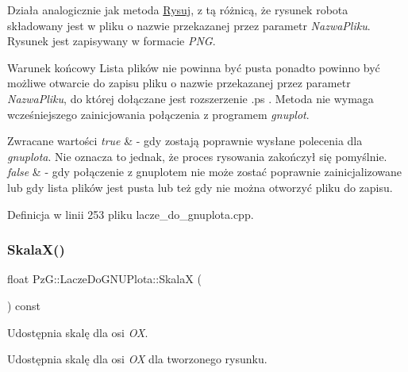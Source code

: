 Działa analogicznie jak metoda \hyperlink{class_pz_g_1_1_lacze_do_g_n_u_plota_a065f5b8402737cc62b0ad4f66d028335}{Rysuj}, z tą różnicą, że rysunek robota składowany jest w pliku o nazwie przekazanej przez parametr {\itshape Nazwa\+Pliku}. Rysunek jest zapisywany w formacie {\itshape P\+NG}.

\begin{DoxyPostcond}{Warunek końcowy}
Lista plików nie powinna być pusta ponadto powinno być możliwe otwarcie do zapisu pliku o nazwie przekazanej przez parametr {\itshape Nazwa\+Pliku}, do której dołączane jest rozszerzenie .ps . Metoda nie wymaga wcześniejszego zainicjowania połączenia z programem {\itshape gnuplot}.
\end{DoxyPostcond}

\begin{DoxyRetVals}{Zwracane wartości}
{\em true} & -\/ gdy zostają poprawnie wysłane polecenia dla {\itshape gnuplota}. Nie oznacza to jednak, że proces rysowania zakończył się pomyślnie. \\
\hline
{\em false} & -\/ gdy połączenie z gnuplotem nie może zostać poprawnie zainicjalizowane lub gdy lista plików jest pusta lub też gdy nie można otworzyć pliku do zapisu. \\
\hline
\end{DoxyRetVals}


Definicja w linii 253 pliku lacze\+\_\+do\+\_\+gnuplota.\+cpp.

\mbox{\label{class_pz_g_1_1_lacze_do_g_n_u_plota_a4b1eb252fd785a5aeff938e7b2dce2b1}} 
\subsubsection{\texorpdfstring{Skala\+X()}{SkalaX()}}
{\footnotesize\ttfamily float Pz\+G\+::\+Lacze\+Do\+G\+N\+U\+Plota\+::\+SkalaX (\begin{DoxyParamCaption}{ }\end{DoxyParamCaption}) const\hspace{0.3cm}{\ttfamily [inline]}}



Udostępnia skalę dla osi {\itshape OX}. 

Udostępnia skalę dla osi {\itshape OX} dla tworzonego rysunku. 

